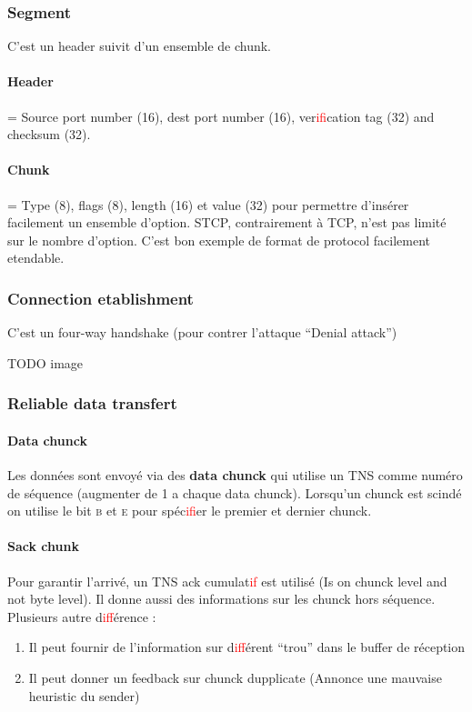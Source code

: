 \subsubsection{Segment}
C'est un header suivit d'un ensemble de chunk.

\paragraph{Header} = Source port number (16), dest port number (16), ver\textcolor{red}{if}ication tag (32) and checksum (32).

\paragraph{Chunk} = Type (8), flags (8), length (16) et value (32) pour permettre d'insérer facilement un ensemble d'option. STCP, contrairement à TCP, n'est pas limité sur le nombre d'option. C'est bon exemple de format de protocol facilement etendable.

\subsubsection{Connection etablishment}
C'est un four-way handshake (pour contrer l'attaque ``Denial attack'')

TODO image

\subsubsection{Reliable data transfert}

\paragraph{Data chunck}
Les données sont envoyé via des \textbf{data chunck} qui utilise un TNS comme
numéro de séquence (augmenter de 1 a chaque data chunck). Lorsqu'un chunck est
scindé on utilise le bit \textsc{b} et \textsc{e} pour spéc\textcolor{red}{if}ier le premier et dernier
chunck.

\paragraph{Sack chunk}
Pour garantir l'arrivé, un TNS ack cumulat\textcolor{red}{if} est utilisé (Is on chunck level and not
byte level). Il donne aussi des informations sur les chunck hors séquence.
Plusieurs autre d\textcolor{red}{if}férence :
\begin{enumerate}
    \item Il peut fournir de l'information sur d\textcolor{red}{if}férent ``trou'' dans le buffer de réception
    \item Il peut donner un feedback sur chunck dupplicate (Annonce une mauvaise heuristic du sender)
\end{enumerate}

